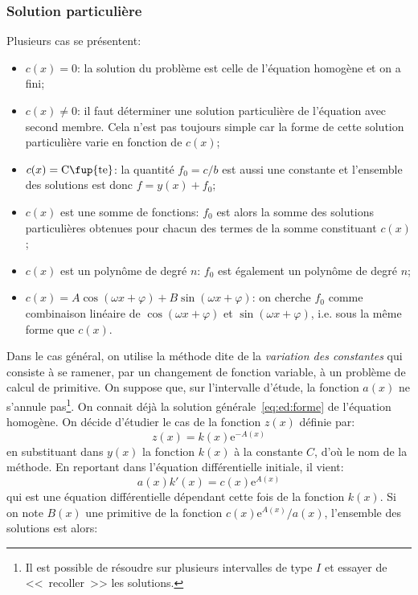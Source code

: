 \subsubsection{Solution particulière} 
Plusieurs cas se présentent:
\begin{itemize}
\item $c(x)=0$: la solution du problème est celle de l'équation homogène et on a fini;
\item $c(x)\ne0$: il faut déterminer une solution particulière de l'équation avec second membre. Cela n'est pas toujours simple car la forme de cette solution particulière varie en fonction de $c(x)$;
\item $c(x)=\text{C\fup{te}}$: la quantité $f_0=c/b$ est aussi une constante et l'ensemble des solutions est donc $f=y(x)+f_0$;
\item $c(x)$ est une somme de fonctions: $f_0$ est alors la somme des solutions particulières obtenues pour chacun des termes de la somme constituant $c(x)$;
\item $c(x)$ est un polynôme de degré $n$: $f_0$ est également un polynôme de degré $n$;
\item $c(x) = A\cos(\omega x + \varphi) + B \sin(\omega x + \varphi)$: on cherche $f_0$ comme combinaison linéaire de $\cos(\omega x + \varphi)$ et $\sin(\omega x + \varphi)$, i.e. sous la même forme que $c(x)$. 
\end{itemize}
Dans le cas général, on utilise la méthode dite de la \emph{variation des constantes} qui consiste à se ramener, par un changement de fonction variable, à un problème de calcul de primitive. On suppose que, sur l'intervalle d'étude, la fonction $a(x)$ ne s'annule pas\footnote{Il est possible de résoudre sur plusieurs intervalles de type $I$ et essayer de <<~recoller~>> les solutions.}. On connait déjà la solution générale~\eqref{eq:ed:forme} de l'équation homogène. On décide d'étudier le cas de la fonction $z(x)$ définie par:
\begin{equation}
z(x) = k(x)\mathrm{e}^{- A(x)}
\end{equation}
en substituant dans $y(x)$ la fonction $k(x)$ à la constante $C$, d'où le nom de la méthode. En reportant dans l'équation différentielle initiale, il vient:
\begin{equation}
a(x)k'(x) = c(x)\mathrm{e}^{A(x)}
\end{equation}
qui est une équation différentielle dépendant cette fois de la fonction $k(x)$. Si on note $B(x)$ une primitive de la fonction $c(x) \mathrm{e}^{A(x)}/a(x)$, l'ensemble des solutions est alors:
